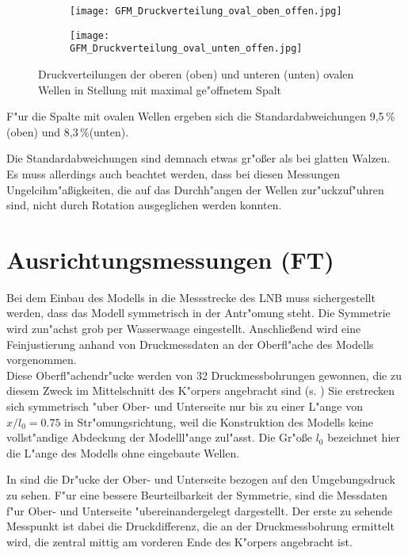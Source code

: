 \begin{figure}[h]
	\centering
	\begin{subfigure}[c]{0.85\textwidth}		
		\texttt{[image: GFM\_Druckverteilung\_oval\_oben\_offen.jpg]}
	\end{subfigure}
	\begin{subfigure}[c]{0.85\textwidth}
		\texttt{[image: GFM\_Druckverteilung\_oval\_unten\_offen.jpg]}
	\end{subfigure}
	\caption{Druckverteilungen der oberen (oben) und unteren (unten) ovalen Wellen in Stellung mit maximal ge"offnetem Spalt}
	\label{fig:Druckverteilung_oval_offen}
\end{figure}

F"ur die Spalte mit ovalen Wellen ergeben sich die Standardabweichungen 9,5\,\% (oben) und 8,3\,\%(unten).

Die Standardabweichungen sind demnach etwas gr"o\ss{}er als bei glatten Walzen. Es muss allerdings auch beachtet werden, dass bei diesen Messungen Ungelcihm"a\ss{}igkeiten, die auf das Durchh"angen der Wellen zur"uckzuf"uhren sind, nicht durch Rotation ausgeglichen werden konnten.


\section{Ausrichtungsmessungen (FT)}
\label{s:Vorueberlegungen}
Bei dem Einbau des Modells in die Messstrecke des LNB muss sichergestellt werden, dass das Modell symmetrisch in der Antr"omung steht. Die Symmetrie wird zun"achst grob per Wasserwaage eingestellt. Anschlie\ss{}end wird eine Feinjustierung anhand von Druckmessdaten an der Oberfl"ache des Modells vorgenommen.\\
Diese Oberfl"achendr"ucke werden von 32 Druckmessbohrungen gewonnen, die zu diesem Zweck im Mittelschnitt des K"orpers angebracht sind (s. )
Sie erstrecken sich symmetrisch "uber Ober- und Unterseite nur bis zu einer L"ange von $x/l_{0} = 0.75$ in Str"omungsrichtung, weil die Konstruktion des Modells keine vollst"andige Abdeckung der Modelll"ange zul"asst.
Die Gr"o\ss{}e $l_0$ bezeichnet hier die L"ange des Modells ohne eingebaute Wellen.

In  sind die Dr"ucke der Ober- und Unterseite bezogen auf den Umgebungsdruck zu sehen.
F"ur eine bessere Beurteilbarkeit der Symmetrie, sind die Messdaten f"ur Ober- und Unterseite "ubereinandergelegt dargestellt. Der erste zu sehende Messpunkt ist dabei die Druckdifferenz, die an der Druckmessbohrung ermittelt wird, die zentral mittig am vorderen Ende des K"orpers angebracht ist.

